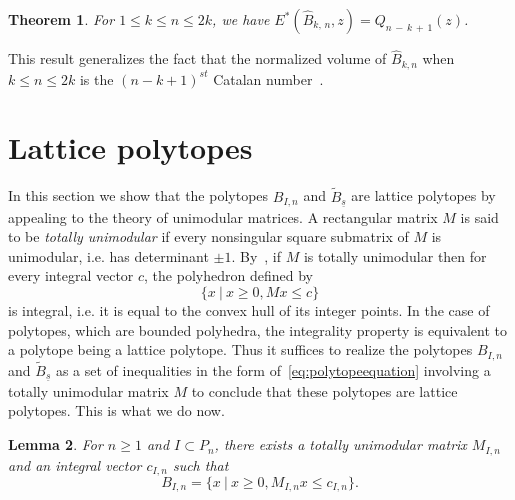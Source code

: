\documentclass[11pt]{article}
\newtheorem{theo}{Theorem}[section]
\newtheorem{lemm}[theo]{Lemma}
\theoremstyle{definition}
\numberwithin{equation}{section}
\numberwithin{figure}{section}
\numberwithin{table}{section}
\newcommand*{\MK}{\mkern 2mu}
\begin{document}
\begin{theo}\label{thm:Narayana}
For $1 \leq k \leq n \leq 2k$, we have $E^*(\hat{B}_{k,\,n},z)=Q_{n\,-\,k\,+\,1}(z)$.
\end{theo}

This result generalizes the fact that the normalized volume of $\hat{B}_{k,n}$ when $k \leq n \leq 2k$ is the $(n-k+1)^{st}$ Catalan number~\cite[Exercise~4.56$\MK$(e)]{S12}.

\section{Lattice polytopes}\label{sec:lattice}

In this section we show that the polytopes $B_{I,n}$ and $\widetilde{B}_{\underline{s}}$ are lattice polytopes by appealing to the theory of unimodular matrices. A rectangular matrix $M$ is said to be \emph{totally unimodular} if every nonsingular square submatrix of $M$ is unimodular, i.e. has determinant $\pm 1$. By~\cite[Theorem~19.1]{schrijver-1986}, if $M$ is totally unimodular then for every integral vector $c$, the polyhedron defined by
\begin{equation}\label{eq:polytopeequation}
\{x \: | \: x \geq 0, Mx \leq c \}
\end{equation}
is integral, i.e. it is equal to the convex hull of its integer points. In the case of polytopes, which are bounded polyhedra, the integrality property is equivalent to a polytope being a lattice polytope. Thus it suffices to realize the polytopes $B_{I,n}$ and $\widetilde{B}_{\underline{s}}$ as a set of inequalities in the form of~\eqref{eq:polytopeequation} involving a totally unimodular matrix $M$ to conclude that these polytopes are lattice polytopes. This is what we do now.

\begin{lemm}\label{lem:BIintegral}
For $n\geq 1$ and $I\subset P_n$, there exists a totally unimodular matrix $M_{I,n}$ and an integral vector $c_{I,n}$ such that
\[
B_{I,n}=\{x \: | \: x \geq 0, M_{I,n}x \leq c_{I,n} \}.
\]
\end{lemm}
\end{document}
